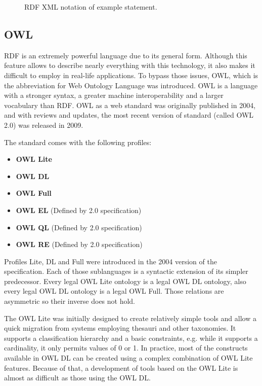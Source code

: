 \begin{figure}[ht]
	\centering
	
	\caption{RDF XML notation of example statement.}
	\label{fig:sample_rdf_xml}
\end{figure}

\subsection{OWL}

RDF is an extremely powerful language due to its general form. Although this feature allows to describe nearly everything with this technology, it also makes it difficult to employ in real-life applications. To bypass those issues, OWL, which is the abbreviation for Web Ontology Language was introduced. OWL is a language with a stronger syntax, a greater machine interoperability and a larger vocabulary than RDF. OWL as a web standard was originally published in 2004, and with reviews and updates, the most recent version of standard (called OWL 2.0) was released in 2009\cite{owlRef:2009, owlPrimer:2009}.

The standard comes with the following profiles:

\begin{itemize}
	\item{ {\bf OWL Lite}}
	\item{ {\bf OWL DL}}
	\item{ {\bf OWL Full}}
	\item{ {\bf OWL EL} (Defined by 2.0 specification)}
	\item{ {\bf OWL QL} (Defined by 2.0 specification)}
	\item{ {\bf OWL RE} (Defined by 2.0 specification)}
\end{itemize}

Profiles Lite, DL and Full were introduced in the 2004 version of the specification. Each of those sublanguages is a syntactic extension of its simpler predecessor. Every legal OWL Lite ontology is a legal OWL DL ontology, also every legal OWL DL ontology is a legal OWL Full. Those relations are asymmetric so their inverse does not hold.

The OWL Lite was initially designed to create relatively simple tools and allow a quick migration from systems employing thesauri and other taxonomies. It supports a classification hierarchy and a basic constraints, e.g. while it supports a cardinality, it only permits values of 0 or 1. In practice, most of the constructs available in OWL DL can be created using a complex combination of OWL Lite features. Because of that, a development of tools based on the OWL Lite is almost as difficult as those using the OWL DL.

